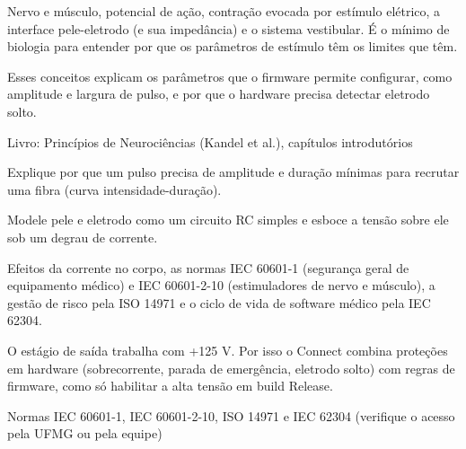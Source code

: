 Nervo e músculo, potencial de ação, contração evocada por estímulo elétrico, a interface pele-eletrodo (e sua impedância) e o sistema vestibular. É o mínimo de biologia para entender por que os parâmetros de estímulo têm os limites que têm.

\begin{noproduto}
Esses conceitos explicam os parâmetros que o firmware permite configurar, como amplitude e largura de pulso, e por que o hardware precisa detectar eletrodo solto.
\end{noproduto}

\begin{paraestudar}
  \item {}
  \item Livro: Princípios de Neurociências (Kandel et al.), capítulos introdutórios
\end{paraestudar}

\begin{pratique}
  \item Explique por que um pulso precisa de amplitude e duração mínimas para recrutar uma fibra (curva intensidade-duração).
  \item Modele pele e eletrodo como um circuito RC simples e esboce a tensão sobre ele sob um degrau de corrente.
\end{pratique}

Efeitos da corrente no corpo, as normas IEC 60601-1 (segurança geral de equipamento médico) e IEC 60601-2-10 (estimuladores de nervo e músculo), a gestão de risco pela ISO 14971 e o ciclo de vida de software médico pela IEC 62304.

\begin{noproduto}
O estágio de saída trabalha com +125 V. Por isso o Connect combina proteções em hardware (sobrecorrente, parada de emergência, eletrodo solto) com regras de firmware, como só habilitar a alta tensão em build Release.
\end{noproduto}

\begin{paraestudar}
  \item Normas IEC 60601-1, IEC 60601-2-10, ISO 14971 e IEC 62304 (verifique o acesso pela UFMG ou pela equipe)
  \item {}
\end{paraestudar}

